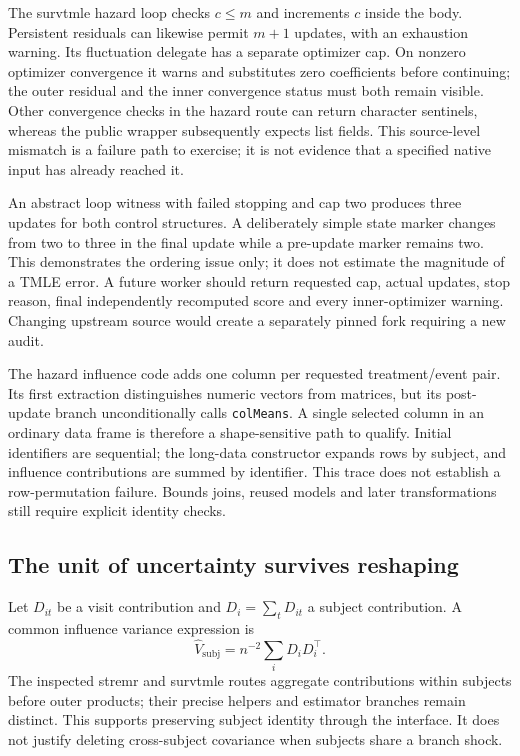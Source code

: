 The survtmle hazard loop checks $c\leq m$ and increments $c$ inside the body.
Persistent residuals can likewise permit $m+1$ updates, with an exhaustion
warning. Its fluctuation delegate has a separate optimizer cap. On nonzero
optimizer convergence it warns and substitutes zero coefficients before
continuing; the outer residual and the inner convergence status must both
remain visible. Other convergence checks in the hazard route can return
character sentinels, whereas the public wrapper subsequently expects list
fields. This source-level mismatch is a failure path to exercise; it is not
evidence that a specified native input has already reached it.
\citep{exec23_longr_survtmle}

An abstract loop witness with failed stopping and cap two produces three
updates for both control structures. A deliberately simple state marker
changes from two to three in the final update while a pre-update marker
remains two. This demonstrates the ordering issue only; it does not estimate
the magnitude of a TMLE error. A future worker should return requested cap,
actual updates, stop reason, final independently recomputed score and every
inner-optimizer warning. Changing upstream source would create a separately
pinned fork requiring a new audit. \citep{exec23_longr_reference}

The hazard influence code adds one column per requested treatment/event pair.
Its first extraction distinguishes numeric vectors from matrices, but its
post-update branch unconditionally calls \texttt{colMeans}. A single selected
column in an ordinary data frame is therefore a shape-sensitive path to
qualify. Initial identifiers are sequential; the long-data constructor expands
rows by subject, and influence contributions are summed by identifier. This
trace does not establish a row-permutation failure. Bounds joins, reused
models and later transformations still require explicit identity checks.
\citep{exec23_longr_survtmle}

\subsection{The unit of uncertainty survives reshaping}
\label{eq:exec23-longr-variance}
Let $D_{it}$ be a visit contribution and $D_i=\sum_t D_{it}$ a subject
contribution. A common influence variance expression is
\[
 \widehat V_{\mathrm{subj}}=n^{-2}\sum_i D_iD_i^\top.
\]
The inspected stremr and survtmle routes aggregate contributions within
subjects before outer products; their precise helpers and estimator branches
remain distinct. This supports preserving subject identity through the
interface. It does not justify deleting cross-subject covariance when subjects
share a branch shock. \citep{exec23_longr_stremr,exec23_longr_survtmle}

